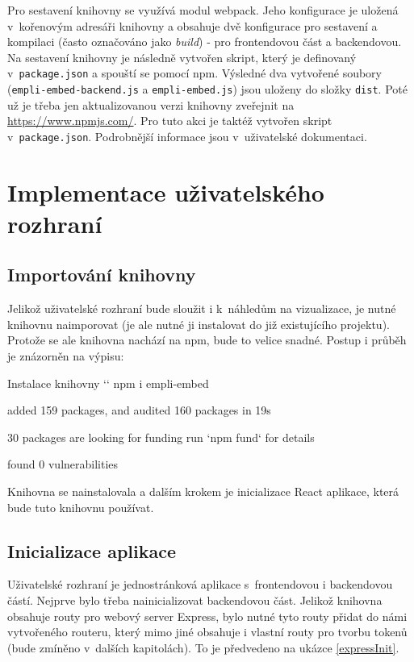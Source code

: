 \documentclass[czech, bc, kiv, he, iso690numb]{fasthesis}
\begin{document}
Pro sestavení knihovny se využívá modul webpack. Jeho konfigurace je uložená v~kořenovým adresáři knihovny a obsahuje dvě konfigurace pro sestavení a kompilaci (často
označováno jako \textit{build}) - pro frontendovou část a backendovou.
Na sestavení knihovny je následně vytvořen skript, který je definovaný v~\texttt{package.json} a spouští se pomocí npm. Výsledné dva vytvořené soubory (\texttt{empli-embed-backend.js} a \texttt{empli-embed.js})
jsou uloženy do složky \texttt{dist}. Poté už je třeba jen aktualizovanou verzi knihovny zveřejnit na \url{https://www.npmjs.com/}. Pro tuto akci je taktéž vytvořen skript v~\texttt{package.json}.
Podrobnější informace jsou v~uživatelské dokumentaci.

\section{Implementace uživatelského rozhraní}

\subsection{Importování knihovny}

Jelikož uživatelské rozhraní bude sloužit i k~náhledům na vizualizace, je nutné knihovnu naimporovat (je ale nutné ji instalovat do již existujícího projektu). Protože se ale knihovna nachází na npm, bude to velice snadné.
Postup i průběh je znázorněn na výpisu: 
\begin{console}{Instalace knihovny}
`\winprompt` npm i empli-embed

added 159 packages, and audited 160 packages in 19s

30 packages are looking for funding
  run `npm fund` for details

found 0 vulnerabilities
\end{console}

Knihovna se nainstalovala a dalším krokem je inicializace React aplikace, která bude tuto knihovnu používat.

\subsection{Inicializace aplikace}

Uživatelské rozhraní je jednostránková aplikace s~frontendovou i backendovou částí. Nejprve bylo třeba nainicializovat backendovou část. Jelikož knihovna obsahuje routy pro webový
server Express, bylo nutné tyto routy přidat do námi vytvořeného routeru, který mimo jiné obsahuje i vlastní routy pro tvorbu tokenů (bude zmíněno v~dalších kapitolách). To je předvedeno na
ukázce \ref{expressInit}.
\end{document}
